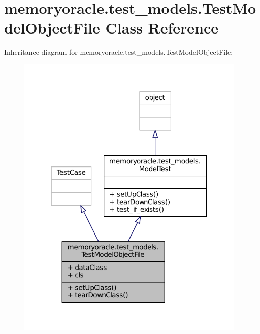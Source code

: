\hypertarget{classmemoryoracle_1_1test__models_1_1TestModelObjectFile}{}\section{memoryoracle.\+test\+\_\+models.\+Test\+Model\+Object\+File Class Reference}
\label{classmemoryoracle_1_1test__models_1_1TestModelObjectFile}


Inheritance diagram for memoryoracle.\+test\+\_\+models.\+Test\+Model\+Object\+File\+:\nopagebreak
\begin{figure}[H]
\begin{center}
\leavevmode
\includegraphics[width=310pt]{classmemoryoracle_1_1test__models_1_1TestModelObjectFile__inherit__graph}
\end{center}
\end{figure}


